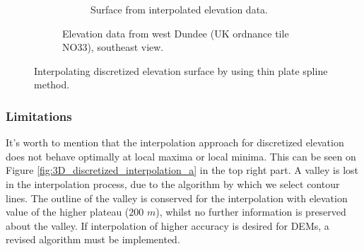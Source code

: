 \documentclass[a4paper,10pt]{report}
\begin{document}
\begin{figure}[H]
\begin{subfigure}{\textwidth}
\begin{subfigure}{.49\textwidth}
        \addtocounter{subfigure}{-1}
        \renewcommand\thesubfigure{\alph{subfigure}) ii}
        \caption{Surface from interpolated elevation data.}
        \end{subfigure}
        \addtocounter{subfigure}{-1}
        \renewcommand\thesubfigure{\alph{subfigure}}
        \caption{Elevation data from west Dundee (UK ordnance tile NO33), southeast view.}
        \label{fig:3D_discretized_interpolation_b}
    \end{subfigure}
    \caption{Interpolating discretized elevation surface by using thin plate spline method.}
    \label{fig:3D_discretized_interpolation}
\end{figure}

\subsubsection{Limitations}
It's worth to mention that the interpolation approach for discretized elevation does not behave optimally at local maxima or local minima. This can be seen on Figure \ref{fig:3D_discretized_interpolation_a} in the top right part. A valley is lost in the interpolation process, due to the algorithm by which we select contour lines. The outline of the valley is conserved for the interpolation with elevation value of the higher plateau ($200$ $m$), whilst no further information is preserved about the valley. If interpolation of higher accuracy is desired for DEMs, a revised algorithm must be implemented.
\end{document}
